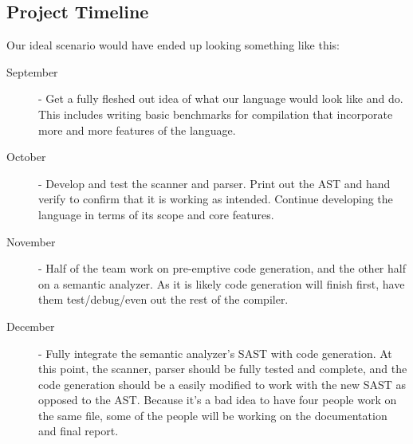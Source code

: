 \documentclass[a4paper]{article}
\begin{document}
\subsection{Project Timeline}
Our ideal scenario would have ended up looking something like this:
\begin{description}
    \item[September] - Get a fully fleshed out idea of what our language would look like and do. This includes writing basic benchmarks for compilation that incorporate more and more features of the language.
    \item[October] - Develop and test the scanner and parser. Print out the AST and hand verify to confirm that it is working as intended. Continue developing the language in terms of its scope and core features.
    \item[November] - Half of the team work on pre-emptive code generation, and the other half on a semantic analyzer. As it is likely code generation will finish first, have them test/debug/even out the rest of the compiler.
    \item[December] - Fully integrate the semantic analyzer's SAST with code generation. At this point, the scanner, parser should be fully tested and complete, and the code generation should be a easily modified to work with the new SAST as opposed to the AST. Because it's a bad idea to have four people work on the same file, some of the people will be working on the documentation and final report. 
\end{description}
\end{document}
